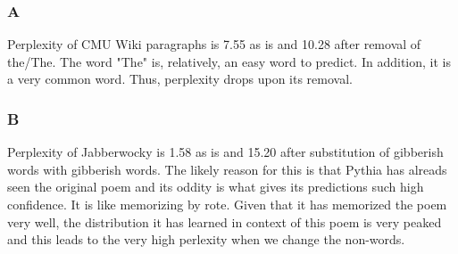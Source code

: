\documentclass[11pt]{article}
\begin{document}
\subsubsection{A}
\label{sec:org12253df}
Perplexity of CMU Wiki paragraphs is 7.55 as is and 10.28 after removal of the/The. The word "The" is, relatively, an easy word to predict. In addition, it is a very common word. Thus, perplexity drops upon its removal.

\subsubsection{B}
\label{sec:org04a70a0}
Perplexity of Jabberwocky is 1.58 as is and 15.20 after substitution of gibberish words with gibberish words. The likely reason for this is that Pythia has alreads seen the original poem and its oddity is what gives its predictions such high confidence. It is like memorizing by rote. Given that it has memorized the poem very well, the distribution it has learned in context of this poem is very peaked and this leads to the very high perlexity when we change the non-words. 
\end{document}
